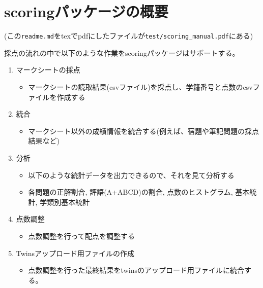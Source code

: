 \def\latexktupreamblefile{scoring_manual.ktu_preamble}
\def\mytitle{scoringパッケージ}
\def\myauthor{山本}
\def\mydate{2019.6.25}
\def\latexxspacing{no}


\newcommand {\mycolor }{olive}

\section{scoringパッケージの概要}
\label{scoringパッケージの概要}

(この\texttt{readme.md}をtexでpdfにしたファイルが\texttt{test\slash scoring\_manual.pdf}にある)

採点の流れの中で以下のような作業をscoringパッケージはサポートする。

\begin{enumerate}
\item マークシートの採点

\begin{itemize}
\item マークシートの読取結果(csvファイル)を採点し、学籍番号と点数のcsvファイルを作成する

\end{itemize}

\item 統合

\begin{itemize}
\item マークシート以外の成績情報を統合する(例えば、宿題や筆記問題の採点結果など)

\end{itemize}

\item 分析

\begin{itemize}
\item 以下のような統計データを出力できるので、それを見て分析する

\item 各問題の正解割合, 評語(A+ABCD)の割合, 点数のヒストグラム, 基本統計, 学類別基本統計

\end{itemize}

\item 点数調整

\begin{itemize}
\item 点数調整を行って配点を調整する

\end{itemize}

\item Twinsアップロード用ファイルの作成

\begin{itemize}
\item 点数調整を行った最終結果をtwinsのアップロード用ファイルに統合する。

\end{itemize}

\end{enumerate}

